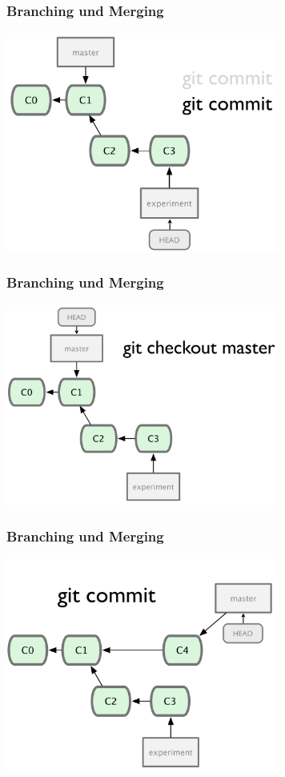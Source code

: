 \begin{frame}
  \frametitle{Branching und Merging}
  \begin{center}
    \includegraphics[width=9cm]{img/branch_3.pdf}
  \end{center}
\end{frame}

\begin{frame}
  \frametitle{Branching und Merging}
  \begin{center}
    \includegraphics[width=9cm]{img/branch_4.pdf}
  \end{center}
\end{frame}

\begin{frame}
  \frametitle{Branching und Merging}
  \begin{center}
    \includegraphics[width=9cm]{img/branch_5.pdf}
  \end{center}
\end{frame}

